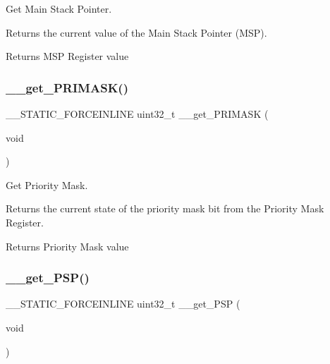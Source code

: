 Get Main Stack Pointer. 

Returns the current value of the Main Stack Pointer (M\+SP). \begin{DoxyReturn}{Returns}
M\+SP Register value 
\end{DoxyReturn}
\mbox{\label{group___c_m_s_i_s___core___reg_acc_functions_ga4ff59fb9e280d19e79e6875863a65f0a}} 
\subsubsection{\texorpdfstring{\_\_get\_PRIMASK()}{\_\_get\_PRIMASK()}}
{\footnotesize\ttfamily \+\_\+\+\_\+\+S\+T\+A\+T\+I\+C\+\_\+\+F\+O\+R\+C\+E\+I\+N\+L\+I\+NE uint32\+\_\+t \+\_\+\+\_\+get\+\_\+\+P\+R\+I\+M\+A\+SK (\begin{DoxyParamCaption}\item[{void}]{ }\end{DoxyParamCaption})}



Get Priority Mask. 

Returns the current state of the priority mask bit from the Priority Mask Register. \begin{DoxyReturn}{Returns}
Priority Mask value 
\end{DoxyReturn}
\mbox{\label{group___c_m_s_i_s___core___reg_acc_functions_ga826c53e30812e350c77f58aac9f42bcb}} 
\subsubsection{\texorpdfstring{\_\_get\_PSP()}{\_\_get\_PSP()}}
{\footnotesize\ttfamily \+\_\+\+\_\+\+S\+T\+A\+T\+I\+C\+\_\+\+F\+O\+R\+C\+E\+I\+N\+L\+I\+NE uint32\+\_\+t \+\_\+\+\_\+get\+\_\+\+P\+SP (\begin{DoxyParamCaption}\item[{void}]{ }\end{DoxyParamCaption})}



